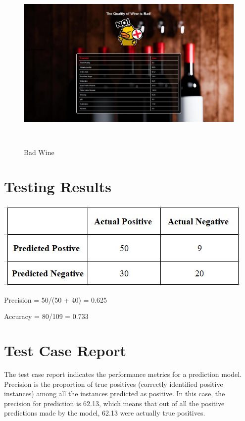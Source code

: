 \documentclass[a4paper, 12pt]{report}
\begin{document}
\linebreak
\linebreak
\begin{figure}[h]
\centering
\\
\includegraphics[width=1\linewidth,frame]{SS/B.jpg}
\linebreak
\caption{Bad Wine}
\\
\end{figure}

\pagebreak

\section{Testing Results }

\begingroup
\centering
\includegraphics[width=0.8\linewidth]{SS/P.JPG}
\vspace{12pt}
\endgroup

\par Precision = 50/(50 + 40) = 0.625
\par Accuracy = 80/109 = 0.733
\newline

\section{Test Case Report }
\linebreak
\par The test case report indicates the performance metrics for a prediction model. Precision is the proportion of true positives (correctly identified positive instances) among all the instances predicted as positive. In this case, the precision for prediction is 62.13, which means that out of all the positive predictions made by the model, 62.13 were actually true positives.
\end{document}
